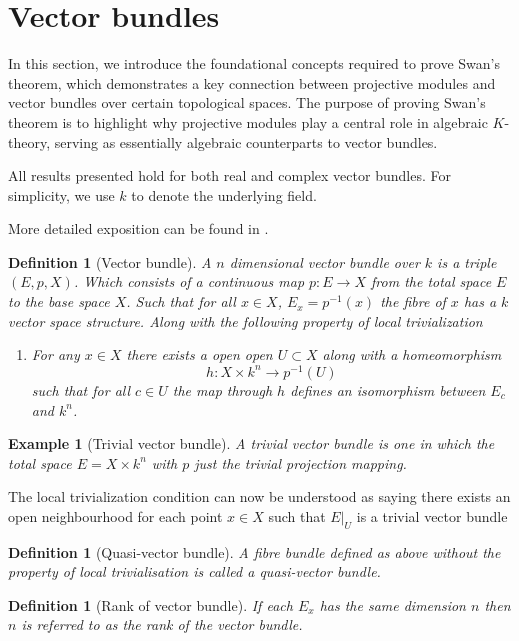 \documentclass[12pt]{article}
\numberwithin{equation}{section}
\newcounter{dummy} \numberwithin{dummy}{section}
\newtheorem{definition}[dummy]{Definition}
\newtheorem{example}[dummy]{Example}
\begin{document}
		\section{Vector bundles}
	 In this section, we introduce the foundational concepts required to prove Swan's theorem, which demonstrates a key connection between projective modules and vector bundles over certain topological spaces. The purpose of proving Swan's theorem is to highlight why projective modules play a central role in algebraic $K$-theory, serving as essentially algebraic counterparts to vector bundles.
	
	All results presented hold for both real and complex vector bundles. For simplicity, we use $k$ to denote the underlying field. 
	
	More detailed exposition can be found in \cite{milnor1974characteristic, karoubi2008k}.
	
	\begin{definition}[Vector bundle]
		A $n$ dimensional vector bundle over $k$ is a triple $(E,p, X)$. Which consists of a continuous map $p:E \to X$ from the total space $E$ to the base space $X$. Such that for all $x \in X$, $E_x=p^{-1}(x)$ the fibre of $x$ has a $k$ vector space structure. Along with the following property of local trivialization
		\begin{enumerate}
			\item For any $x \in X$ there exists a open open $U \subset X$ along with a homeomorphism \[ h: X \times k^n	\to p^{-1}(U) \] such that for all $c \in U$ the map through $h$ defines an isomorphism between $E_c$ and $k^n$.
		\end{enumerate}
	\end{definition}
	\begin{example}[Trivial vector bundle]
		A trivial vector bundle is one in which the total space $E=X \times k^n$ with $p$ just the trivial projection mapping.
	\end{example}
	The local trivialization condition can now be understood as saying there exists an open neighbourhood for each point $x \in X$ such that $E|_U$ is a trivial vector bundle
	\begin{definition}[Quasi-vector bundle]
		A fibre bundle defined as above without the property of local trivialisation is called a quasi-vector bundle.
	\end{definition}
	\begin{definition}[Rank of vector bundle]
		If each $E_x$ has the same dimension $n$ then $n$ is referred to as the rank of the vector bundle.
	\end{definition}
	
\end{document}
